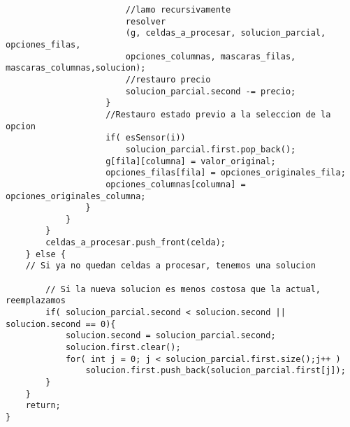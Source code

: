 \documentclass[11pt, a4paper, twoside]{article}
\begin{document}
\begin{lstlisting}
						//lamo recursivamente
						resolver
						(g, celdas_a_procesar, solucion_parcial, opciones_filas,
						opciones_columnas, mascaras_filas, mascaras_columnas,solucion);
						//restauro precio
						solucion_parcial.second -= precio;
					}
					//Restauro estado previo a la seleccion de la opcion
					if( esSensor(i))
						solucion_parcial.first.pop_back();
					g[fila][columna] = valor_original;
					opciones_filas[fila] = opciones_originales_fila;
					opciones_columnas[columna] = opciones_originales_columna;
				}
			}
		}
		celdas_a_procesar.push_front(celda);
	} else {
	// Si ya no quedan celdas a procesar, tenemos una solucion
		
		// Si la nueva solucion es menos costosa que la actual, reemplazamos
		if( solucion_parcial.second < solucion.second || solucion.second == 0){
			solucion.second = solucion_parcial.second;
			solucion.first.clear();
			for( int j = 0; j < solucion_parcial.first.size();j++ )
				solucion.first.push_back(solucion_parcial.first[j]);
		}
	}
	return;
}
\end{lstlisting}

\end{document}
